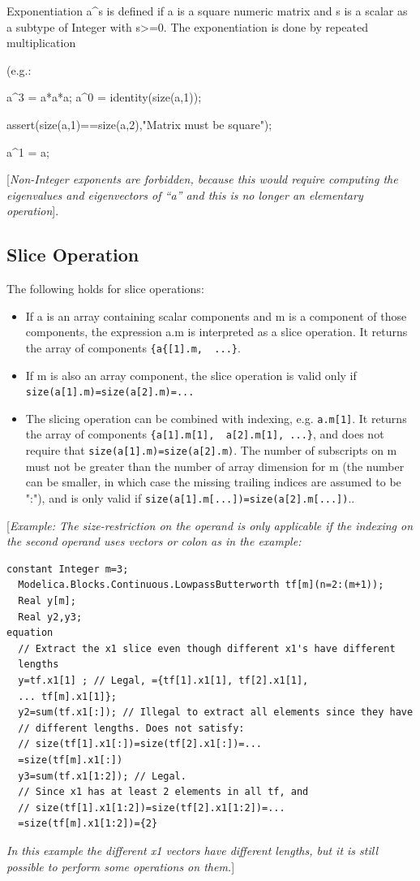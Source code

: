 \documentclass[10pt,a4paper]{report}
\def\doublelabel#1{\label{#1}\hypertarget{#1}{}}
\begin{document}
Exponentiation a\^{}s is defined if a is a square numeric matrix and s
is a scalar as a subtype of Integer with s\textgreater{}=0. The
exponentiation is done by repeated multiplication

(e.g.:

a\^{}3 = a*a*a; a\^{}0 = identity(size(a,1));

assert(size(a,1)==size(a,2),"Matrix must be square");

a\^{}1 = a;

{[}\emph{Non-Integer exponents are forbidden, because this would require
computing the eigenvalues and eigenvectors of ``a'' and this is no
longer an elementary operation}{]}.

\subsection{Slice Operation}\doublelabel{slice-operation}

The following holds for slice operations:

\begin{itemize}
\item
  If a is an array containing scalar components and m is a component of
  those components, the expression a.m is interpreted as a slice operation. It returns the array of components \lstinline!{a{[1].m,  ...}!.
\item
  If m is also an array component, the slice operation is valid only if \lstinline!size(a[1].m)=size(a[2].m)=...!
\item
  The slicing operation can be combined with indexing, e.g. \lstinline!a.m[1]!.
  It returns the array of components  \lstinline!{a[1].m[1],  a[2].m[1], ...}!, and does not require that
   \lstinline!size(a[1].m)=size(a[2].m)!. The number of subscripts on m must
  not be greater than the number of array dimension for m (the number
  can be smaller, in which case the missing trailing indices are assumed
  to be ":"), and is only valid if   \lstinline!size(a[1].m[...])=size(a[2].m[...])!..
\end{itemize}

{[}\emph{Example: The size-restriction on the operand is only applicable
if the indexing on the second operand uses vectors or colon as in the
example:}

\begin{lstlisting}[language=modelica]
  constant Integer m=3;
  Modelica.Blocks.Continuous.LowpassButterworth tf[m](n=2:(m+1));
  Real y[m];
  Real y2,y3;
equation
  // Extract the x1 slice even though different x1's have different
  lengths
  y=tf.x1[1] ; // Legal, ={tf[1].x1[1], tf[2].x1[1],
  ... tf[m].x1[1]};
  y2=sum(tf.x1[:]); // Illegal to extract all elements since they have
  // different lengths. Does not satisfy:
  // size(tf[1].x1[:])=size(tf[2].x1[:])=...
  =size(tf[m].x1[:])
  y3=sum(tf.x1[1:2]); // Legal.
  // Since x1 has at least 2 elements in all tf, and
  // size(tf[1].x1[1:2])=size(tf[2].x1[1:2])=...
  =size(tf[m].x1[1:2])={2}
\end{lstlisting}
\emph{In this example the different x1 vectors have different lengths,
but it is still possible to perform some operations on them.}{]}
\end{document}
